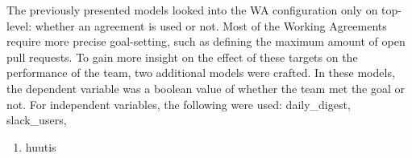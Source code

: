 

The previously presented models looked into the WA configuration only on top-level: whether an agreement is used or not. Most of the Working Agreements require more precise goal-setting, such as defining the maximum amount of open pull requests. To gain more insight on the effect of these targets on the performance of the team, two additional models were crafted. In these models, the dependent variable was a boolean value of whether the team met the goal or not. For independent variables, the following were used: daily\_digest, slack\_users, 


\begin{enumerate}
    \item{huutis}
\end{enumerate}



